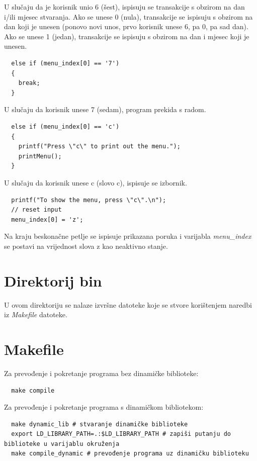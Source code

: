\documentclass[12pt, letterpaper]{article}
\begin{document}
  U slučaju da je korisnik unio 6 (šest), ispisuju se transakcije s obzirom na dan i/ili mjesec stvaranja. Ako se unese 0 (nula), transakcije se ispisuju s obzirom na dan koji je unesen (ponovo novi unos, prvo korisnik unese 6, pa 0, pa sad dan). Ako se unese 1 (jedan), transakcije se ispisuju s obzirom na dan i mjesec koji je unesen.
  

  \begin{verbatim}
  else if (menu_index[0] == '7')
  { 
    break;
  } 
  \end{verbatim}
  U slučaju da korisnik unese 7 (sedam), program prekida s radom.

  \begin{verbatim}
  else if (menu_index[0] == 'c')
  {
    printf("Press \"c\" to print out the menu.");
    printMenu();
  }
  \end{verbatim}
  U slučaju da korisnik unese c (slovo c), ispisuje se izbornik.

  \begin{verbatim}
  printf("To show the menu, press \"c\".\n");
  // reset input
  menu_index[0] = 'z';
  \end{verbatim}
  Na kraju beskonačne petlje se ispisuje prikazana poruka i varijabla \textit{menu\_index} se postavi na vrijednost slova z kao neaktivno stanje.

\section{Direktorij bin}
  U ovom direktoriju se nalaze izvršne datoteke koje se stvore korištenjem naredbi iz \textit{Makefile} datoteke.

\section{Makefile}
  Za prevođenje i pokretanje programa bez dinamičke biblioteke: 
  \begin{verbatim}
  make compile
  \end{verbatim}

  Za prevođenje i pokretanje programa s dinamičkom bibliotekom: 
  \begin{verbatim}
  make dynamic_lib # stvaranje dinamičke biblioteke
  export LD_LIBRARY_PATH=.:$LD_LIBRARY_PATH # zapiši putanju do biblioteke u varijablu okruženja
  make compile_dynamic # prevođenje programa uz dinamičku biblioteku
  \end{verbatim}


  
\end{document}

